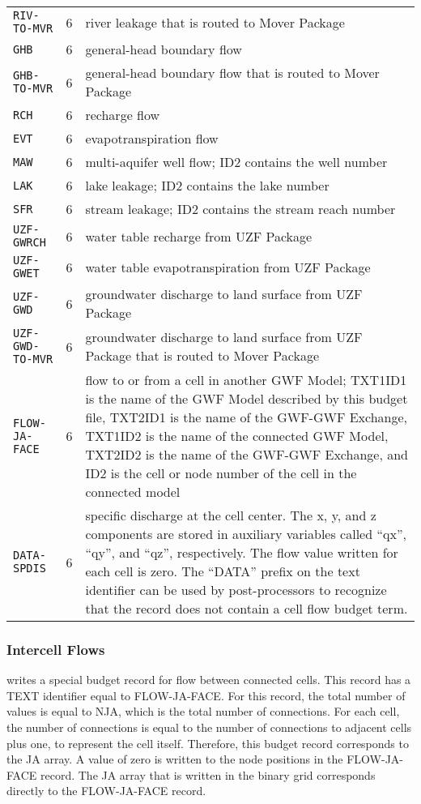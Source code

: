 \begin{longtable}{p{3.5cm} p{2cm} p{9cm}}
\texttt{RIV-TO-MVR} & 6 & river leakage that is routed to Mover Package\\
\texttt{GHB} & 6 & general-head boundary flow \\
\texttt{GHB-TO-MVR} & 6 & general-head boundary flow that is routed to Mover Package\\
\texttt{RCH} & 6 & recharge flow \\
\texttt{EVT} & 6 & evapotranspiration flow \\
\texttt{MAW} & 6 & multi-aquifer well flow; ID2 contains the well number \\
\texttt{LAK} & 6 & lake leakage; ID2 contains the lake number \\
\texttt{SFR} & 6 & stream leakage; ID2 contains the stream reach number \\
\texttt{UZF-GWRCH} & 6 & water table recharge from UZF Package \\
\texttt{UZF-GWET} & 6 & water table evapotranspiration from UZF Package  \\
\texttt{UZF-GWD} & 6 & groundwater discharge to land surface from UZF Package \\
\texttt{UZF-GWD-TO-MVR} & 6 & groundwater discharge to land surface from UZF Package that is routed to Mover Package\\
\texttt{FLOW-JA-FACE} & 6 & flow to or from a cell in another GWF Model; TXT1ID1 is the name of the GWF Model described by this budget file, TXT2ID1 is the name of the GWF-GWF Exchange, TXT1ID2 is the name of the connected GWF Model, TXT2ID2 is the name of the GWF-GWF Exchange, and ID2 is the cell or node number of the cell in the connected model \\
\texttt{DATA-SPDIS} & 6 & specific discharge at the cell center.  The x, y, and z components are stored in auxiliary variables called ``qx'', ``qy'', and ``qz'', respectively.   The flow value written for each cell is zero.  The ``DATA'' prefix on the text identifier can be used by post-processors to recognize that the record does not contain a cell flow budget term.
\label{table:gwfbud}
\end{longtable}

\subsubsection{Intercell Flows}

\mf writes a special budget record for flow between connected cells. This record has a TEXT identifier equal to FLOW-JA-FACE. For this record, the total number of values is equal to NJA, which is the total number of connections.  For each cell, the number of connections is equal to the number of connections to adjacent cells plus one, to represent the cell itself. Therefore, this budget record corresponds to the JA array. A value of zero is written to the node positions in the FLOW-JA-FACE record.  The JA array that is written in the binary grid corresponds directly to the FLOW-JA-FACE record.

